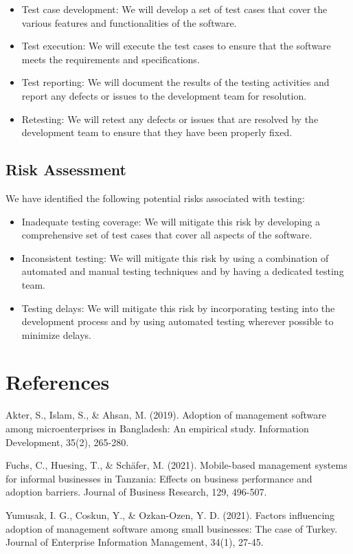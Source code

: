 \documentclass{article}
\begin{document}
\begin{itemize}
\item Test case development: We will develop a set of test cases that cover the various features and functionalities of the software.
\item Test execution: We will execute the test cases to ensure that the software meets the requirements and specifications.
\item Test reporting: We will document the results of the testing activities and report any defects or issues to the development team for resolution.
\item Retesting: We will retest any defects or issues that are resolved by the development team to ensure that they have been properly fixed.
\end{itemize}

\subsection{Risk Assessment}
We have identified the following potential risks associated with testing:

\begin{itemize}
\item Inadequate testing coverage: We will mitigate this risk by developing a comprehensive set of test cases that cover all aspects of the software.
\item Inconsistent testing: We will mitigate this risk by using a combination of automated and manual testing techniques and by having a dedicated testing team.
\item Testing delays: We will mitigate this risk by incorporating testing into the development process and by using automated testing wherever possible to minimize delays.
\end{itemize}
\newpage


\section{References}
\renewcommand{\refname}{}
\begin{thebibliography}{10}
	
	Akter, S., Islam, S., \& Ahsan, M. (2019). Adoption of management software among microenterprises in Bangladesh: An empirical study. Information Development, 35(2), 265-280.

	Fuchs, C., Huesing, T., \& Schäfer, M. (2021). Mobile-based management systems for informal businesses in Tanzania: Effects on business performance and adoption barriers. Journal of Business Research, 129, 496-507.

	Yumusak, I. G., Coskun, Y., \& Ozkan-Ozen, Y. D. (2021). Factors influencing adoption of management software among small businesses: The case of Turkey. Journal of Enterprise Information Management, 34(1), 27-45.

\end{thebibliography}
\end{document}

